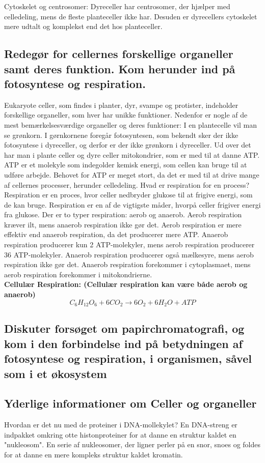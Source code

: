             Cytoskelet og centrosomer: Dyreceller har centrosomer, der hjælper med celledeling, mens de fleste planteceller ikke har. Desuden er dyrecellers cytoskelet mere udtalt og komplekst end det hos planteceller.

    \subsection{Redegør for cellernes forskellige organeller samt deres funktion. Kom herunder ind på fotosyntese og respiration.}
    Eukaryote celler, som findes i planter, dyr, svampe og protister, indeholder forskellige organeller, som hver har unikke funktioner. Nedenfor er nogle af de mest bemærkelsesværdige organeller og deres funktioner:
    I en plantecelle vil man se grønkorn. I gørnkornene foregår fotosyntesen, som bekendt sker der ikke fotosyntese i dyreceller, og derfor er der ikke grønkorn i dyreceller. Ud over det har man i plante celler og dyre celler mitokondrier, som er med til at danne ATP. ATP er et molekyle som indegolder kemisk energi, som cellen kan bruge til at udføre arbejde. Behovet for ATP er meget stort, da det er med til at drive mange af cellernes processer, herunder celledeling.
    Hvad er respiration for en process? Respiration er en proces, hvor celler nedbryder glukose til at frigive energi, som de kan bruge. Respiration er en af de vigtigste måder, hvorpå celler frigiver energi fra glukose. Der er to typer respiration: aerob og anaerob. 
    Aerob respiration kræver ilt, mens anaerob respiration ikke gør det. Aerob respiration er mere effektiv end anaerob respiration, da det producerer mere ATP. Anaerob respiration producerer kun 2 ATP-molekyler, mens aerob respiration producerer 36 ATP-molekyler. Anaerob respiration producerer også mælkesyre, mens aerob respiration ikke gør det. Anaerob respiration forekommer i cytoplasmaet, mens aerob respiration forekommer i mitokondrierne. \\
    \textbf{Cellulær Respiration: (Cellulær respiration kan være både aerob og anaerob) }\begin{equation}C_6H_{12}O_6 + 6CO_2 \rightarrow 6O_2 + 6H_2O + ATP \end{equation}


    \subsection{Diskuter forsøget om papirchromatografi, og kom i den forbindelse ind på betydningen af fotosyntese og respiration, i organismen, såvel som i et økosystem}

    \subsection{Yderlige informationer om Celler og organeller}
    Hvordan er det nu med de proteiner i DNA-mollekylet? \label{sec:protein} En DNA-streng er indpakket omkring otte histonproteiner for at danne en struktur kaldet en "nukleosom". En serie af nukleosomer, der ligner perler på en snor, snoes og foldes for at danne en mere kompleks struktur kaldet kromatin. 
